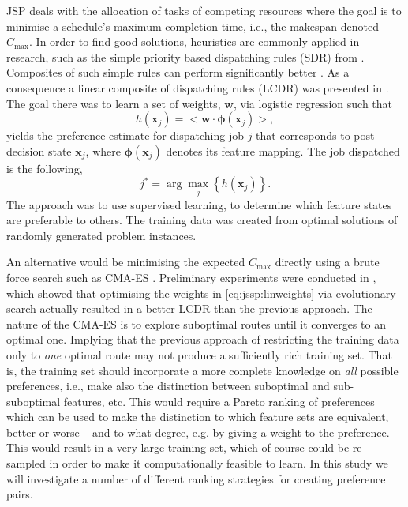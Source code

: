 \documentclass[smallextended]{llncs}
\newcommand{\vphi}{{\boldsymbol{\phi}}}
\renewcommand{\vec}[1]{\mathbf{#1}}
\newcommand{\shortcite}[1]{\cite{#1}}
\begin{document}
JSP deals with the allocation of tasks of competing resources where the goal is to minimise a schedule's maximum completion time, i.e., the makespan denoted $C_{\max}$. In order to find good solutions, heuristics are commonly applied in research, such as the simple priority based dispatching rules (SDR) from \cite{Panwalkar77}. Composites of such simple rules can perform significantly better \cite{Jayamohan04}. 
As a consequence a linear composite of dispatching rules (LCDR) was presented  in \shortcite{InRu11a}. The goal there was to learn a set of weights, $\vec{w}$, via logistic regression such that 
\begin{equation}\label{eq:jssp:linweights}
h(\vec{x}_j)=\big<{\vec{w}}\cdot{\vphi(\vec{x}_j)}\big>,
\end{equation}
yields the preference estimate for dispatching job $j$ that corresponds to post-decision state $\vec{x}_j$, where $\vphi(\vec{x}_j)$ denotes its feature mapping. The job dispatched is the following, 
\begin{equation}\label{eq:jstar}
j^* = \arg\max_j\left\{h(\vec{x}_j)\right\}. 
\end{equation}
The approach was to use supervised learning, to determine which feature states are preferable to others. 
The training data was created from optimal solutions of randomly generated problem instances. 

An alternative would be minimising the expected $C_{\max}$ directly using a brute force search such as CMA-ES \cite{Hansen01}. Preliminary experiments were conducted in \shortcite{InRu14a}, which showed that optimising the weights in \cref{eq:jssp:linweights} via evolutionary search actually resulted in a better LCDR than the previous approach. The nature of the CMA-ES is to explore suboptimal routes until it converges to an optimal one. Implying that the previous approach of restricting the training data only to \emph{one} optimal route may not produce a sufficiently rich training set. That is, the training set should incorporate a more complete knowledge on \emph{all} possible preferences, i.e., make also the distinction between suboptimal and sub-suboptimal features, etc.  This would require a Pareto ranking of preferences which can be used to make the distinction to which feature sets are equivalent, better or worse -- and to what degree, e.g. by giving a weight to the preference. This would result in a very large training set, which of course could be re-sampled in order to make it computationally feasible to learn. In this study we will investigate a number of different ranking strategies for creating preference pairs.
\end{document}
